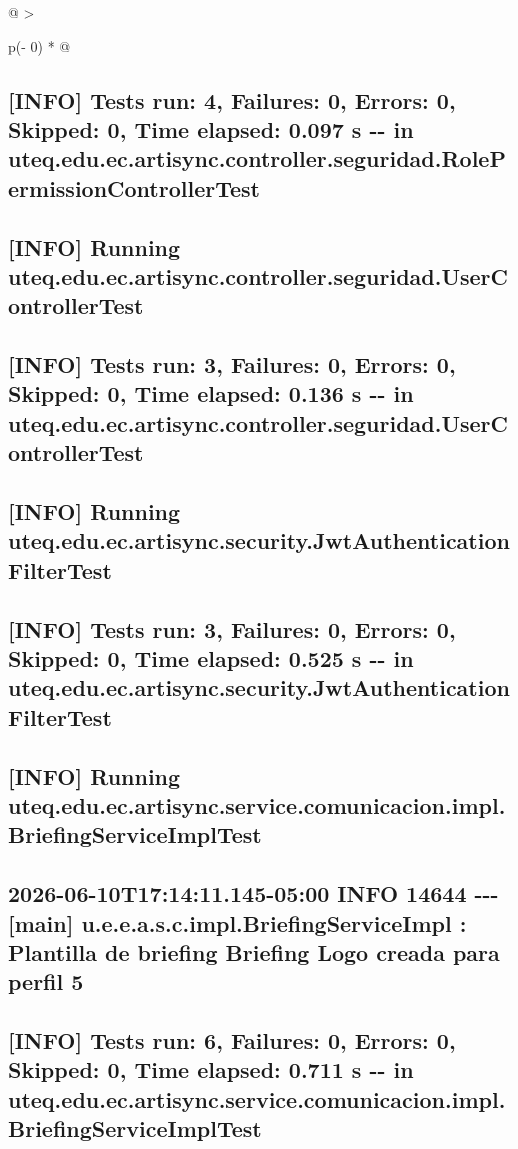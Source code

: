 \documentclass[
]{article}
\begin{document}
\begin{longtable}[]{@{}
  >{\raggedright\arraybackslash}p{(\columnwidth - 0\tabcolsep) * }@{}}
\begin{minipage}[b]{\linewidth}
\subsection{{[}INFO{]} Tests run: 4, Failures: 0, Errors: 0, Skipped: 0,
Time elapsed: 0.097 s -\/- in
uteq.edu.ec.artisync.controller.seguridad.RolePermissionControllerTest}

\subsection{{[}INFO{]} Running
uteq.edu.ec.artisync.controller.seguridad.UserControllerTest}

\subsection{{[}INFO{]} Tests run: 3, Failures: 0, Errors: 0, Skipped: 0,
Time elapsed: 0.136 s -\/- in
uteq.edu.ec.artisync.controller.seguridad.UserControllerTest}

\subsection{{[}INFO{]} Running
uteq.edu.ec.artisync.security.JwtAuthenticationFilterTest}

\subsection{{[}INFO{]} Tests run: 3, Failures: 0, Errors: 0, Skipped: 0,
Time elapsed: 0.525 s -\/- in
uteq.edu.ec.artisync.security.JwtAuthenticationFilterTest}

\subsection{\texorpdfstring{{[}INFO{]} Running
uteq.edu.ec.artisync.service.comunicacion.impl.BriefingServiceImplTest
}{{[}INFO{]} Running uteq.edu.ec.artisync.service.comunicacion.impl.BriefingServiceImplTest }}

\subsection{2026-06-10T17:14:11.145-05:00 INFO 14644 -\/-\/- {[}main{]}
u.e.e.a.s.c.impl.BriefingServiceImpl : Plantilla de briefing
\textquotesingle Briefing Logo\textquotesingle{} creada para perfil
5}

\subsection{{[}INFO{]} Tests run: 6, Failures: 0, Errors: 0, Skipped: 0,
Time elapsed: 0.711 s -\/- in
uteq.edu.ec.artisync.service.comunicacion.impl.BriefingServiceImplTest}


\end{minipage}
\end{longtable}
\end{document}
